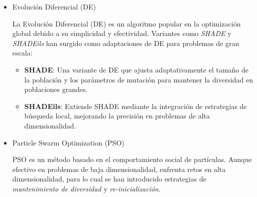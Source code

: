 \begin{itemize}

\item{Evolución Diferencial (DE)}

La Evolución Diferencial (DE) \cite{DE} es un algoritmo popular en la optimización global debido a su simplicidad y efectividad. Variantes como \textit{SHADE} y \textit{SHADEils} han surgido como adaptaciones de DE para problemas de gran escala:
\begin{itemize}
    \item \textbf{SHADE}: Una variante de DE que ajusta adaptativamente el tamaño de la población y los parámetros de mutación para mantener la diversidad en poblaciones grandes.
    \item \textbf{SHADEils}: Extiende SHADE mediante la integración de estrategias de búsqueda local, mejorando la precisión en problemas de alta dimensionalidad.
\end{itemize}

\item{Particle Swarm Optimization (PSO)}

PSO \cite{PSO} es un método basado en el comportamiento social de partículas. Aunque efectivo en problemas de baja dimensionalidad, enfrenta retos en alta dimensionalidad, para lo cual se han introducido estrategias de \textit{mantenimiento de diversidad} y \textit{re-inicialización}.

\end{itemize}

